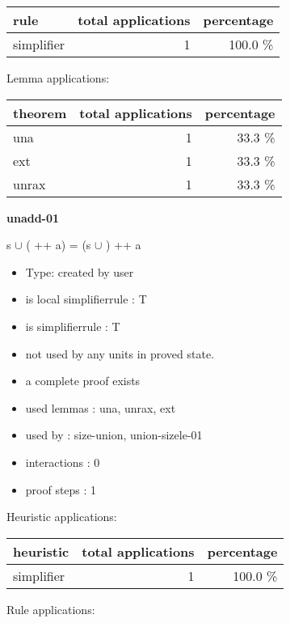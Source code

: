 \documentclass[a4paper]{article}
\begin{document}
\begin{supertabular}{l|r|r}
rule	        & total applications & percentage \\ \hline
simplifier & 1 & 100.0 \% \\

\end{supertabular}

Lemma applications:

\begin{supertabular}{l|r|r}
theorem	        & total applications & percentage \\ \hline
una & 1 & 33.3 \% \\
ext & 1 & 33.3 \% \\
unrax & 1 & 33.3 \% \\

\end{supertabular}
\pagebreak

{\LARGE\bf unadd-01}\label{lemma-unadd-01}

\medskip

 \Fol s $\cup$ ( ++ a) = (s $\cup$ ) ++ a

\begin{itemize}

\item Type: created by user

\item is local simplifierrule : T
\item is simplifierrule : T
\item not used by any units in proved state.
\item       a complete proof exists
\item       used lemmas  : una, unrax, ext
\item       used by      : size-union, union-sizele-01
\item       interactions : 0
\item       proof steps  : 1
\end{itemize}

\medskip


Heuristic applications:

\begin{supertabular}{l|r|r}
heuristic	& total applications & percentage \\ \hline
simplifier & 1 & 100.0 \% \\

\end{supertabular}

Rule applications:
\end{document}
